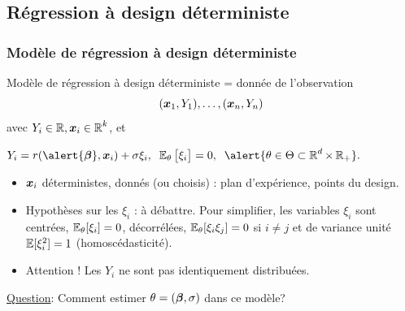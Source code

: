 \subsection{Régression à design déterministe}



\begin{frame}
\frametitle{Modèle de régression à design déterministe}
\begin{df}
Modèle de régression \alert{à design déterministe} = donnée de
l'observation
$$(\operatorname{\boldsymbol{x}}_1,Y_1),\ldots, (\operatorname{\boldsymbol{x}}_n,Y_n)$$
avec $Y_i \in \operatorname{{\mathbb R}}, \operatorname{\boldsymbol{x}}_i\in \operatorname{{\mathbb R}}^k$, et \\\vspace{3mm} \centerline{$Y_i
=
r(\alert{\truebeta},\bx_i)+ \sigma \xi_i,\;\;\E_{\truetheta}\big[\xi_i\big]=0,\;\;\alert{
\truetheta \in \Theta \subset \R^d \times \R_+}.$}
\begin{itemize}
\item $\operatorname{\boldsymbol{x}}_i$ déterministes, donnés (ou choisis) : plan d'expérience, points du \og design\fg{}.
\item Hypothèses sur les $\xi_i$ : à débattre. \alert{Pour simplifier}, les variables $\xi_i$ sont centrées, $\operatorname{{\mathbb E}}_{\theta}[\xi_i]=0$,
décorrélées, $\operatorname{{\mathbb E}}_{\theta}[\xi_i \xi_j]= 0$ si $i \ne j$ et de variance unité $\operatorname{{\mathbb E}}[\xi_i^2]= 1$ \alert{ (homoscédasticité)}.
\item \alert{ Attention !} Les $Y_i$ ne sont \alert{pas identiquement distribuées}.
\end{itemize}
\end{df}

 \underline{Question}: Comment estimer $\theta=(\boldsymbol{\beta},\sigma)$ dans ce modèle?

\end{frame}

